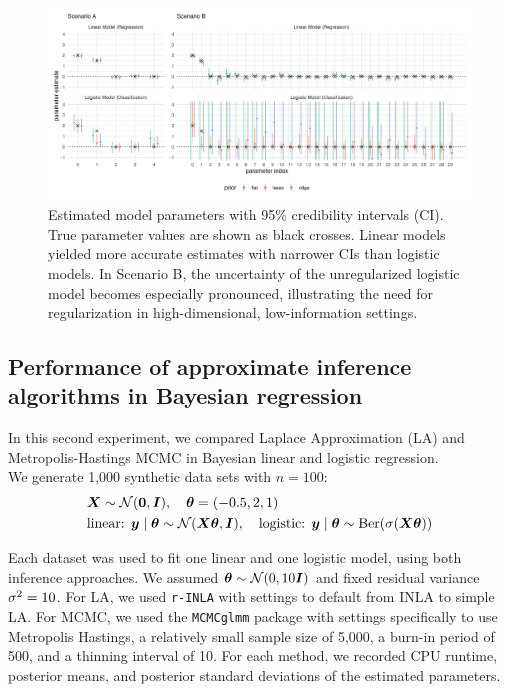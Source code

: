 \begin{figure}[htbp]
    \centering
    \includegraphics[width=\linewidth]{../figures/reg_all.png}
    \caption{Estimated model parameters with 95\% credibility intervals (CI). True parameter values are shown as black crosses. Linear models yielded more accurate estimates with narrower CIs than logistic models. In Scenario B, the uncertainty of the unregularized logistic model becomes especially pronounced, illustrating the need for regularization in high-dimensional, low-information settings.
    }
    \label{fig:reg-params}
\end{figure}

\subsection{Performance of approximate inference algorithms in Bayesian regression}

In this second experiment, we compared Laplace Approximation (LA) and Metropolis-Hastings MCMC in Bayesian linear and logistic regression.\\

We generate 1,000 synthetic data sets with $n=100$:
\begin{equation*}
    \begin{aligned}
        &\bm{X} \sim \mathcal{N}(\bm{0}, \bm{I}), \quad \bm{\theta} = (-0.5, 2, 1)\\
        &\text{linear: } \bm{y} \mid \bm{\theta} \sim \mathcal{N}(\bm{X} \bm{\theta}, \bm{I}),\quad \text{logistic: } \bm{y} \mid \bm{\theta} \sim \text{Ber}(\sigma(\bm{X} \bm{\theta}))
    \end{aligned}
\end{equation*}

Each dataset was used to fit one linear and one logistic model, using both inference approaches.
We assumed $\bm{\theta} \sim \mathcal{N}(0, 10 \bm{I})$ and fixed residual variance $\sigma^2 = 10$.
For LA, we used \texttt{r-INLA} with settings to default from INLA to simple LA.
For MCMC, we used the \texttt{MCMCglmm} package with settings specifically to use Metropolis Hastings, a relatively small sample size of 5,000, a burn-in period of 500, and a thinning interval of 10.
For each method, we recorded CPU runtime, posterior means, and posterior standard deviations of the estimated parameters.\\

